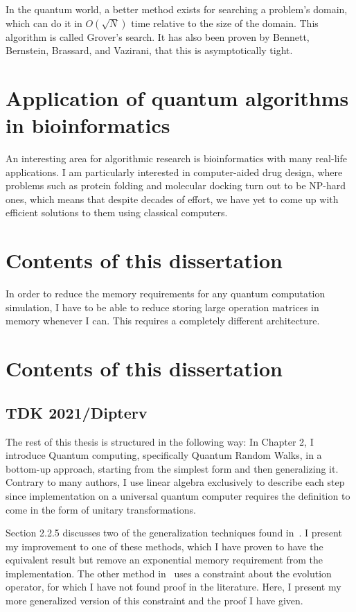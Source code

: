 In the quantum world, a better method exists for searching a problem's domain, which can do it in $O(\sqrt{N})$ time relative to the size of the domain. This algorithm is called Grover's search. It has also been proven by Bennett, Bernstein, Brassard, and Vazirani, that this is asymptotically tight\cite{bennett_strengths_1997}.

\section{Application of quantum algorithms in bioinformatics}

An interesting area for algorithmic research is bioinformatics with many real-life applications. I am particularly interested in computer-aided drug design, where problems such as protein folding\cite{crescenzi_complexity_1998} and molecular docking\cite{a_molecular_2018} turn out to be NP-hard ones, which means that despite decades of effort, we have yet to come up with efficient solutions to them using classical computers.


\section{Contents of this dissertation}

In order to reduce the memory requirements for any quantum computation simulation, I have to be able to reduce storing large operation matrices in memory whenever I can. This requires a completely different architecture.



\section{Contents of this dissertation}

\subsection{TDK 2021/Dipterv}

The rest of this thesis is structured in the following way: In Chapter 2, I introduce Quantum computing, specifically Quantum Random Walks, in a bottom-up approach, starting from the simplest form and then generalizing it. Contrary to many authors, I use linear algebra exclusively to describe each step since implementation on a universal quantum computer requires the definition to come in the form of unitary transformations.

Section 2.2.5 discusses two of the generalization techniques found in~\cite{Portugal}. I present my improvement to one of these methods, which I have proven to have the equivalent result but remove an exponential memory requirement from the implementation. The other method in~\cite{Portugal} uses a constraint about the evolution operator, for which I have not found proof in the literature. Here, I present my more generalized version of this constraint and the proof I have given.


